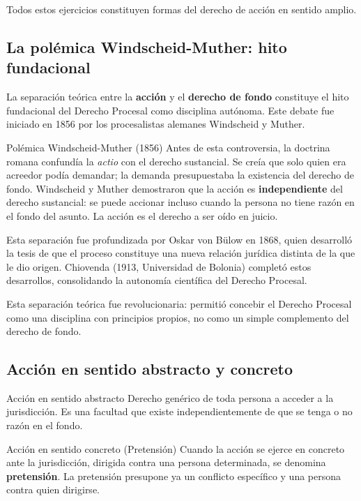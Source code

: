 \documentclass[12pt,oneside]{book}
\begin{document}
Todos estos ejercicios constituyen formas del derecho de acción en sentido amplio.

\subsection{La polémica Windscheid-Muther: hito fundacional}

La separación teórica entre la \textbf{acción} y el \textbf{derecho de fondo} constituye el hito fundacional del Derecho Procesal como disciplina autónoma. Este debate fue iniciado en 1856 por los procesalistas alemanes Windscheid y Muther.

\begin{definition}{Polémica Windscheid-Muther (1856)}
Antes de esta controversia, la doctrina romana confundía la \textit{actio} con el derecho sustancial. Se creía que solo quien era acreedor podía demandar; la demanda presupuestaba la existencia del derecho de fondo. Windscheid y Muther demostraron que la acción es \textbf{independiente} del derecho sustancial: se puede accionar incluso cuando la persona no tiene razón en el fondo del asunto. La acción es el derecho a ser oído en juicio.
\end{definition}

Esta separación fue profundizada por Oskar von Bülow en 1868, quien desarrolló la tesis de que el proceso constituye una nueva relación jurídica distinta de la que le dio origen. Chiovenda (1913, Universidad de Bolonia) completó estos desarrollos, consolidando la autonomía científica del Derecho Procesal.

\begin{important}
Esta separación teórica fue revolucionaria: permitió concebir el Derecho Procesal como una disciplina con principios propios, no como un simple complemento del derecho de fondo.
\end{important}

\subsection{Acción en sentido abstracto y concreto}

\begin{definition}{Acción en sentido abstracto}
Derecho genérico de toda persona a acceder a la jurisdicción. Es una facultad que existe independientemente de que se tenga o no razón en el fondo.
\end{definition}

\begin{definition}{Acción en sentido concreto (Pretensión)}
Cuando la acción se ejerce en concreto ante la jurisdicción, dirigida contra una persona determinada, se denomina \textbf{pretensión}. La pretensión presupone ya un conflicto específico y una persona contra quien dirigirse.
\end{definition}
\end{document}
